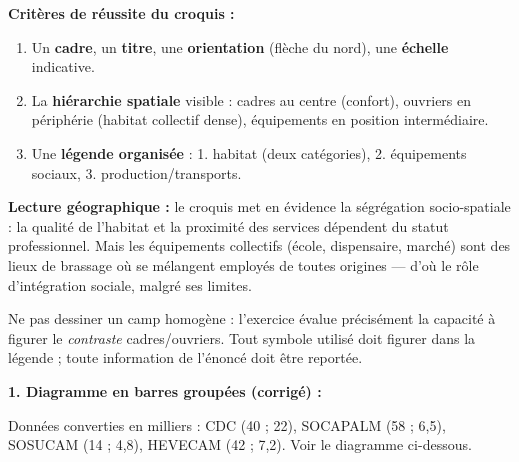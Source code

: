 \documentclass[11pt]{article}
\newcommand{\cle}[1]{{\popxbold\color{popdark}#1}}
\begin{document}
\begin{corrige}
\textbf{Critères de réussite du croquis :}
\begin{enumerate}
\item Un \textbf{cadre}, un \textbf{titre}, une \textbf{orientation} (flèche du nord), une \textbf{échelle} indicative.
\item La \textbf{hiérarchie spatiale} visible : cadres au centre (confort), ouvriers en périphérie (habitat collectif dense), équipements en position intermédiaire.
\item Une \textbf{légende organisée} : 1. habitat (deux catégories), 2. équipements sociaux, 3. production/transports.
\end{enumerate}

\textbf{Lecture géographique :} le croquis met en évidence la \cle{ségrégation socio-spatiale} : la qualité de l'habitat et la proximité des services dépendent du statut professionnel. Mais les équipements collectifs (école, dispensaire, marché) sont des lieux de brassage où se mélangent employés de toutes origines — d'où le rôle d'intégration sociale, malgré ses limites.
\end{corrige}

\begin{attention}
Ne pas dessiner un camp homogène : l'exercice évalue précisément la capacité à figurer le \emph{contraste} cadres/ouvriers. Tout symbole utilisé doit figurer dans la légende ; toute information de l'énoncé doit être reportée.
\end{attention}

\begin{corrige}
\textbf{1. Diagramme en barres groupées (corrigé) :}

Données converties en milliers : CDC (40 ; 22), SOCAPALM (58 ; 6,5), SOSUCAM (14 ; 4,8), HEVECAM (42 ; 7,2). Voir le diagramme ci-dessous.
\end{corrige}
\end{document}
